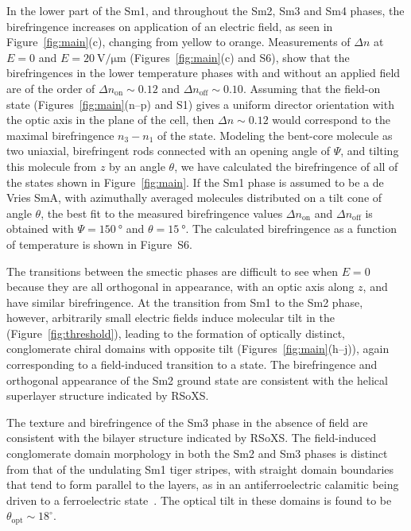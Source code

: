In the lower part of the Sm1, and throughout the Sm2, Sm3 and Sm4 phases, the birefringence increases on application of an electric field, as seen in Figure~\ref{fig:main}(c),  changing from yellow to orange.
Measurements of $\Delta n$ at $E = 0$ and $E = \SI{20}{\volt\per\micro\metre}$
(Figures~\ref{fig:main}(c) and S6),
show that the birefringences in the lower temperature
phases with and without an applied field are of the order of $\Delta n_\text{on} \sim 0.12$ and $\Delta n_\text{off} \sim 0.10$.
Assuming that the field-on  state
(Figures~\ref{fig:main}(n--p) and S1) gives a uniform
director orientation with the optic axis in the plane of the cell, then $\Delta
n \sim 0.12$ would correspond to the maximal birefringence $n_3-n_1$ of the
 state. Modeling the bent-core molecule
as two uniaxial, birefringent rods connected with an opening angle of
$\Psi$, and tilting this molecule from $z$ by an angle $\theta$,
we have calculated the birefringence of all of the states shown in
Figure~\ref{fig:main}. If the Sm1 phase is assumed to be a de Vries SmA, with
azimuthally averaged molecules distributed on a tilt cone of angle
$\theta$, the best fit to the measured birefringence values $\Delta n_\text{on}$ and $\Delta n_\text{off}$ is
obtained with $\Psi = \SI{150}{\degree}$ and $\theta = \SI{15}{\degree}$.
The calculated birefringence as a function of temperature is shown in Figure~S6.



The transitions between the smectic phases are difficult to see when $E=0$ because they are all orthogonal in appearance,
with an optic axis along $z$, and have similar birefringence.
At the transition from Sm1 to the Sm2 phase,  however, arbitrarily small electric fields induce molecular tilt in the
(Figure~\ref{fig:threshold}), leading to the formation of optically distinct, conglomerate chiral
domains with opposite tilt (Figures~\ref{fig:main}(h--j)), again
corresponding to a field-induced transition to a  state.
The birefringence and orthogonal appearance of the Sm2 ground state are consistent with
the helical superlayer structure indicated by RSoXS.

The texture and birefringence of the Sm3 phase in the absence of field are consistent with the  bilayer structure indicated by RSoXS.
The field-induced conglomerate domain morphology in both the Sm2 and Sm3 phases is distinct from that of the undulating Sm1
tiger stripes, with straight
domain boundaries that tend to form parallel to the layers, as in an
antiferroelectric calamitic being driven to a ferroelectric
state~\cite{li1995reversible}.
The optical tilt in these domains is found to be $\theta_\mathrm{opt}\sim 18^\circ$.

